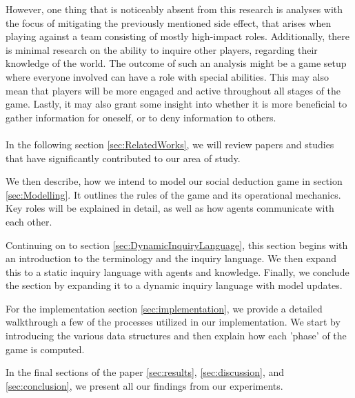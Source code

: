 However, one thing that is noticeably absent from this research is analyses
with the focus of mitigating the previously mentioned side effect, that arises
when playing against a team consisting of mostly high-impact roles.
Additionally, there is minimal research on the ability to inquire other
players, regarding their knowledge of the world. The outcome of such an
analysis might be a game setup where everyone involved can have a role with
special abilities. This may also mean that players will be more engaged and
active throughout all stages of the game. Lastly, it may also grant some
insight into whether it is more beneficial to gather information for oneself,
or to deny information to others.\\ \\

In the following section \ref{sec:RelatedWorks}, we will review papers and
studies that have significantly contributed to our area of study.

We then describe, how we intend to model our social deduction game in section
\ref{sec:Modelling}. It outlines the rules of the game and its operational
mechanics. Key roles will be explained in detail, as well as how agents
communicate with each other.

Continuing on to section \ref{sec:DynamicInquiryLanguage}, this section begins
with an introduction to the terminology and the inquiry language. We then
expand this to a static inquiry language with agents and knowledge. Finally, we
conclude the section by expanding it to a dynamic inquiry language with model
updates.

For the implementation section \ref{sec:implementation}, we provide a detailed
walkthrough a few of the processes utilized in our implementation. We start by
introducing the various data structures and then explain how each 'phase' of
the game is computed.

In the final sections of the paper \ref{sec:results}, \ref{sec:discussion}, and
\ref{sec:conclusion}, we present all our findings from our experiments.